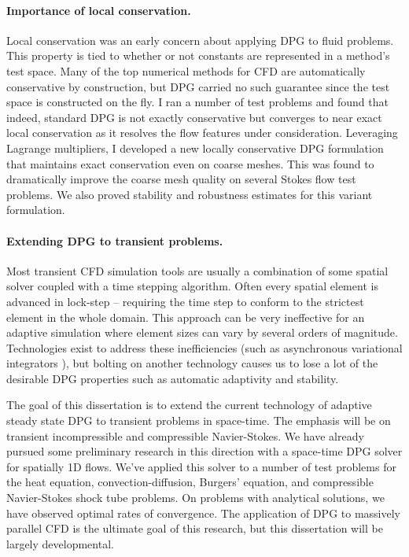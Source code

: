\documentclass[letterpaper,12pt]{article}
\begin{document}
\paragraph{Importance of local conservation.}
Local conservation was an early concern about applying DPG to fluid problems. 
This property is tied to whether or not constants are represented in a method's test space.
Many of the top numerical methods for CFD are automatically conservative by construction, 
but DPG carried no such guarantee since the test space is constructed on the fly.
I ran a number of test problems and found that indeed, standard DPG is not exactly conservative but converges to near exact local conservation 
as it resolves the flow features under consideration.
Leveraging Lagrange multipliers, I developed a new locally conservative DPG formulation \cite{EllisLC} 
that maintains exact conservation even on coarse meshes.
This was found to dramatically improve the coarse mesh quality on several Stokes flow test problems.
We also proved stability and robustness estimates for this variant formulation.

\paragraph{Extending DPG to transient problems.}
Most transient CFD simulation tools are usually a combination of some spatial solver coupled with a time stepping algorithm.
Often every spatial element is advanced in lock-step -- requiring the time step to conform to the strictest element in the whole domain.
This approach can be very ineffective for an adaptive simulation where element sizes can vary by several orders of magnitude.
Technologies exist to address these inefficiencies (such as asynchronous variational integrators \cite{Lew2003}), but bolting on another technology
causes us to lose a lot of the desirable DPG properties such as automatic adaptivity and stability.

The goal of this dissertation is to extend the current technology of adaptive steady state DPG to transient problems in space-time.
The emphasis will be on transient incompressible and compressible Navier-Stokes.
We have already pursued some preliminary research in this direction with a space-time DPG solver for spatially 1D flows.
We've applied this solver to a number of test problems for the heat equation, convection-diffusion, Burgers' equation, 
and compressible Navier-Stokes shock tube problems.
On problems with analytical solutions, we have observed optimal rates of convergence.
The application of DPG to massively parallel CFD is the ultimate goal of this research, but this dissertation will be largely developmental.
\end{document}
